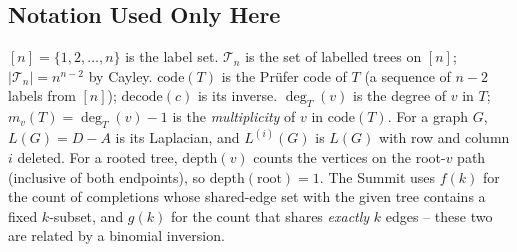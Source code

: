 \subsection*{Notation Used Only Here}

\([n]=\{1,2,\dots,n\}\) is the label set.  \(\mathcal{T}_n\) is the set of
labelled trees on \([n]\); \(|\mathcal{T}_n|=n^{n-2}\) by Cayley.  \(\mathrm{code}(T)\) is the
Pr\"ufer code of \(T\) (a sequence of \(n-2\) labels from \([n]\));
\(\mathrm{decode}(c)\) is its inverse.  \(\deg_T(v)\) is the degree of \(v\) in
\(T\); \(m_v(T)=\deg_T(v)-1\) is the \emph{multiplicity} of \(v\) in
\(\mathrm{code}(T)\).  For a graph \(G\), \(L(G)=D-A\) is its Laplacian, and
\(L^{(i)}(G)\) is \(L(G)\) with row and column \(i\) deleted.  For a rooted
tree, \(\mathrm{depth}(v)\) counts the vertices on the root-\(v\) path
(inclusive of both endpoints), so \(\mathrm{depth}(\text{root})=1\).  The
Summit uses \(f(k)\) for the count of completions whose shared-edge set with
the given tree contains a fixed \(k\)-subset, and \(g(k)\) for the count that
shares \emph{exactly} \(k\) edges -- these two are related by a binomial
inversion.

